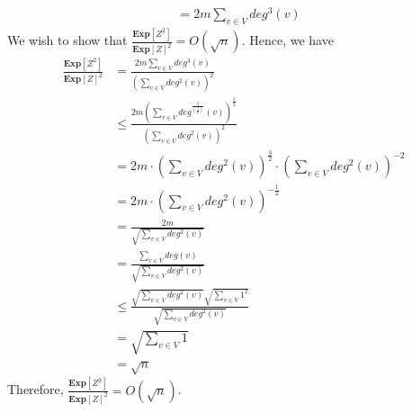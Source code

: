 \documentclass[12pt]{article}
\begin{document}
\begin{solution}
\begin{enumerate}[label=(\alph*)]
\begin{align*}
        &= 2m \sum\limits_{v \in V} deg^3(v)
    \end{align*}
    We wish to show that $\frac{\textbf{Exp}[Z^2]}{\textbf{Exp}[Z]^2} = O(\sqrt{n})$. Hence, we have
    \begin{align*}
        \frac{\textbf{Exp}[Z^2]}{\textbf{Exp}[Z]^2} &= \frac{2m\sum\limits_{v \in V} deg^3(v)}{\left(\sum\limits_{v \in V}deg^2(v)\right)^2} \\
        &\leq \frac{2m \left(\sum\limits_{v \in V}deg^{\frac{3}{\left(\frac{3}{2}\right)}}(v)\right)^{\frac{3}{2}}}{\left(\sum\limits_{v \in V}deg^2(v)\right)^2} \\
        &= 2m \cdot \left(\sum\limits_{v \in V}deg^2(v)\right)^\frac{3}{2} \cdot \left(\sum\limits_{v \in V}deg^2(v)\right)^{-2} \\
        &= 2m \cdot \left(\sum\limits_{v \in V}deg^2(v)\right)^{-\frac{1}{2}} \\
        &= \frac{2m}{\sqrt{\sum\limits_{v \in V} deg^2(v)}} \\
        &= \frac{\sum\limits_{v \in V}deg(v)}{\sqrt{\sum\limits_{v \in V}deg^2(v)}} \\
        &\leq \frac{\sqrt{\sum\limits_{v \in V} deg^2(v)} \sqrt{\sum\limits_{v \in V} 1^2}}{\sqrt{\sum\limits_{v \in V}deg^2(v)}} \\
        &= \sqrt{\sum\limits_{v \in V} 1} \\
        &= \sqrt{n}
    \end{align*}
    Therefore, $\frac{\textbf{Exp}[Z^2]}{\textbf{Exp}[Z]^2} = O(\sqrt{n})$.
\end{enumerate}


\end{solution}
\end{document}

